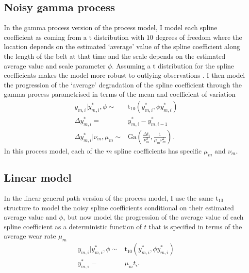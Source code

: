 \subsection{Noisy gamma process}
In the gamma process version of the process model, I model each spline coefficient as coming from a $\mbox{t}$ distribution with $10$ degrees of freedom where the location depends on the estimated `average' value of the spline coefficient along the length of the belt at that time and the scale depends on the estimated average value and scale parameter $\phi$. Assuming a $\mbox{t}$ distribution for the spline coefficients makes the model more robust to outlying observations \citep[Chapter~17]{BDA2020}. I then model the progression of the `average' degradation of the spline coefficient through the gamma process parametrised in terms of the mean and coefficient of variation
\begin{align*}
  y_{m, i}|y^*_{m, i}, \phi      \sim & \mbox{t}_{10}\left(y^*_{m, i}, \phi y^*_{m, i}\right)                       \\
  \Delta  y^*_{m, i}                = & y^*_{m, i} - y^*_{m, i-1}                                                   \\
  \Delta y^*_{m, i}|\nu_m, \mu_m \sim & \mbox{Ga}\left( \frac{\Delta t_i}{\nu_m^2}, \frac{1}{\mu_m \nu_m^2} \right).
\end{align*}
In this process model, each of the $m$ spline coefficients has specific $\mu_m$ and $\nu_m$.

\subsection{Linear model}
In the linear general path version of the process model, I use the same $\mbox{t}_{10}$ structure to model the noisy spline coefficients conditional on their estimated average value and $\phi$, but now model the progression of the average value of each spline coefficient as a deterministic function of $t$ that is specified in terms of the average wear rate $\mu_m$
\begin{align*}
  y_{m, i}|y^*_{m, i}, \phi \sim & \mbox{t}_{10}\left(y^*_{m, i}, \phi y^*_{m, i}\right)  \\
  y^*_{m, i}                   = & \mu_m t_{i}.
\end{align*}

